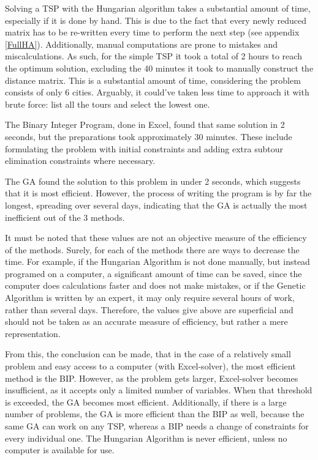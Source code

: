Solving a TSP with the Hungarian algorithm takes a substantial amount of time, especially if it is done by hand. This is due to the fact that every newly reduced matrix has to be re-written every time to perform the next step (see appendix \ref{FullHA}). Additionally, manual computations are prone to mistakes and miscalculations. As such, for the simple TSP it took a total of 2 hours to reach the optimum solution, excluding the 40 minutes it took to manually construct the distance matrix. This is a substantial amount of time, considering the problem consists of only 6 cities. Arguably, it could’ve taken less time to approach it with brute force: list all the tours and select the lowest one.


The Binary Integer Program, done in Excel, found that same solution in 2 seconds, but the preparations took approximately 30 minutes. These include formulating the problem with initial constraints and adding extra subtour elimination constraints where necessary.


The GA found the solution to this problem in under 2 seconds, which suggests that it is most efficient. However, the process of writing the program is by far the longest, spreading over several days, indicating that the GA is actually the most inefficient out of the 3 methods.


It must be noted that these values are not an objective measure of the efficiency of the methods. Surely, for each of the methods there are ways to decrease the time. For example, if the Hungarian Algorithm is not done manually, but instead programed on a computer, a significant amount of time can be saved, since the computer does calculations faster and does not make mistakes, or if the Genetic Algorithm is written by an expert, it may only require several hours of work, rather than several days. Therefore, the values give above are superficial and should not be taken as an accurate measure of efficiency, but rather a mere representation.

From this, the conclusion can be made, that in the case of a relatively small problem and easy access to a computer (with Excel-solver), the most efficient method is the BIP. However, as the problem gets larger, Excel-solver becomes insufficient, as it accepts only a limited number of variables. When that threshold is exceeded, the GA becomes most efficient. Additionally, if there is a large number of problems, the GA is more efficient than the BIP as well, because the same GA can work on any TSP, whereas a BIP needs a change of constraints for every individual one. The Hungarian Algorithm is never efficient, unless no computer is available for use.